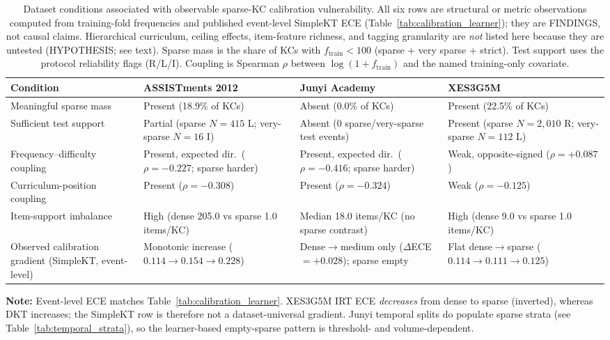 \begin{table}[htbp]
\caption{Dataset conditions associated with observable sparse-KC calibration vulnerability. All six rows are structural or metric observations computed from training-fold frequencies and published event-level SimpleKT ECE (Table~\ref{tab:calibration_learner}); they are FINDINGS, not causal claims. Hierarchical curriculum, ceiling effects, item-feature richness, and tagging granularity are \emph{not} listed here because they are untested (HYPOTHESIS; see text). Sparse mass is the share of KCs with $f_{\mathrm{train}}<100$ (sparse + very sparse + strict). Test support uses the protocol reliability flags (R/L/I). Coupling is Spearman $\rho$ between $\log(1+f_{\mathrm{train}})$ and the named training-only covariate.}
\label{tab:a5_dataset_conditions}
\centering
\footnotesize
\setlength{\tabcolsep}{3.5pt}
\begin{tabularx}{\textwidth}{>{\raggedright\arraybackslash}p{3.3cm}XXX}
\toprule
\textbf{Condition} & \textbf{ASSISTments 2012} & \textbf{Junyi Academy} & \textbf{XES3G5M} \\
\midrule
Meaningful sparse mass & Present (18.9\% of KCs) & Absent (0.0\% of KCs) & Present (22.5\% of KCs) \\
\midrule
Sufficient test support & Partial (sparse $N=415$ L; very-sparse $N=16$ I) & Absent (0 sparse/very-sparse test events) & Present (sparse $N=2{,}010$ R; very-sparse $N=112$ L) \\
\midrule
Frequency--difficulty coupling & Present, expected dir.\ ($\rho=-0.227$; sparse harder) & Present, expected dir.\ ($\rho=-0.416$; sparse harder) & Weak, opposite-signed ($\rho=+0.087$) \\
\midrule
Curriculum-position coupling & Present ($\rho=-0.308$) & Present ($\rho=-0.324$) & Weak ($\rho=-0.125$) \\
\midrule
Item-support imbalance & High (dense 205.0 vs sparse 1.0 items/KC) & Median 18.0 items/KC (no sparse contrast) & High (dense 9.0 vs sparse 1.0 items/KC) \\
\midrule
Observed calibration gradient (SimpleKT, event-level) & Monotonic increase ($0.114\to 0.154\to 0.228$) & Dense$\to$medium only ($\Delta$ECE$=+0.028$); sparse empty & Flat dense$\to$sparse ($0.114\to 0.111\to 0.125$) \\
\bottomrule
\end{tabularx}

\vspace{1ex}
{\scriptsize \textbf{Note:} Event-level ECE matches Table~\ref{tab:calibration_learner}. XES3G5M IRT ECE \emph{decreases} from dense to sparse (inverted), whereas DKT increases; the SimpleKT row is therefore not a dataset-universal gradient. Junyi temporal splits do populate sparse strata (see Table~\ref{tab:temporal_strata}), so the learner-based empty-sparse pattern is threshold- and volume-dependent.\par}
\end{table}
